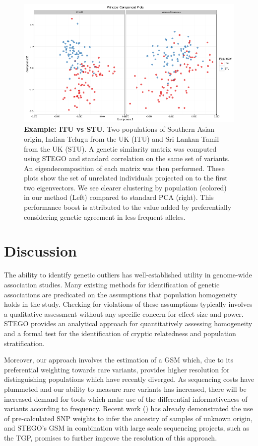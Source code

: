 \begin{figure}
\includegraphics[width=1\columnwidth]{./figures/figure5.eps}
\caption[Separation of ITU vs STU comparison of methods]{\textbf{Example: ITU vs STU}. Two populations of Southern Asian origin,
Indian Telugu from the UK (ITU) and Sri Lankan Tamil from the UK (STU).
A genetic similarity matrix was computed using STEGO and standard
correlation on the same set of variants. An eigendecomposition of each matrix was then performed. These
plots show the set of unrelated individuals projected on to the first
two eigenvectors. We see clearer clustering by population (colored)
in our method (Left) compared to standard PCA (right). This performance
boost is attributed to the value added by preferentially considering
genetic agreement in less frequent alleles.}
\label{fig: ITUvsSTU}
\end{figure}


\section{Discussion}

The ability to identify genetic outliers has well-established utility
in genome-wide association studies. Many existing methods for identification
of genetic associations are predicated on the assumptions that population
homogeneity holds in the study. Checking for violations of these assumptions
typically involves a qualitative assessment without any specific concern
for effect size and power. STEGO provides an analytical approach for
quantitatively assessing homogeneity and a formal test for the identification
of cryptic relatedness and population stratification.  

Moreover, our approach involves the estimation of a GSM which, due to its preferential weighting towards rare variants, provides higher resolution for distinguishing populations which have recently diverged.  As sequencing costs have plummeted and our ability to measure rare variants has increased, there will be increased demand for tools which make use of the differential informativeness of variants according to frequency.  Recent work (\citealp{chen2013improved}) has already demonstrated the use of pre-calculated SNP weights to infer the ancestry of samples of unknown origin, and STEGO's GSM in combination with large scale sequencing projects, such as the TGP, promises to further improve the resolution of this approach.

